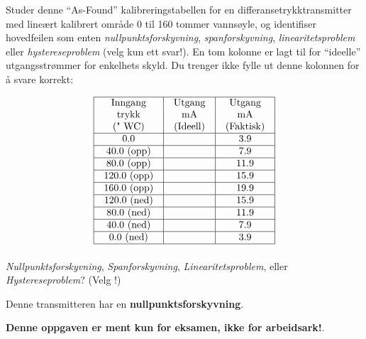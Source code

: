 

Studer denne ``As-Found'' kalibreringstabellen for en differansetrykktransmitter med lineært kalibrert område 0 til 160 tommer vannsøyle, og identifiser hovedfeilen som enten {\it nullpunktsforskyvning}, {\it spanforskyvning}, {\it linearitetsproblem} eller {\it hystereseproblem} (velg kun ett svar!). En tom kolonne er lagt til for ``ideelle'' utgangsstrømmer for enkelhets skyld. Du trenger ikke fylle ut denne kolonnen for å svare korrekt:


$$\vbox{\offinterlineskip
\halign{\strut
\vrule \quad\hfil # \ \hfil & 
\vrule \quad\hfil # \ \hfil & 
\vrule \quad\hfil # \ \hfil \vrule \cr
\noalign{\hrule}
%
Inngang & Utgang & Utgang \cr
%
trykk & mA & mA \cr
%
(" WC) & (Ideell) & (Faktisk) \cr
%
\noalign{\hrule}
%
0.0 & & 3.9 \cr
%
\noalign{\hrule}
%
40.0 (opp) & & 7.9 \cr
%
\noalign{\hrule}
%
80.0 (opp) & & 11.9 \cr
%
\noalign{\hrule}
%
120.0 (opp) & & 15.9 \cr
%
\noalign{\hrule}
%
160.0 (opp) & & 19.9 \cr
%
\noalign{\hrule}
%
120.0 (ned) & & 15.9 \cr
%
\noalign{\hrule}
%
80.0 (ned) & & 11.9 \cr
%
\noalign{\hrule}
%
40.0 (ned) & & 7.9 \cr
%
\noalign{\hrule}
%
0.0 (ned) & & 3.9 \cr
%
\noalign{\hrule}
} %
}$$ %

{\it Nullpunktsforskyvning}, {\it Spanforskyvning}, {\it Linearitetsproblem}, eller {\it Hystereseproblem}? (Velg !)







Denne transmitteren har en {\bf nullpunktsforskyvning}.







{\bf Denne oppgaven er ment kun for eksamen, ikke for arbeidsark!}.


